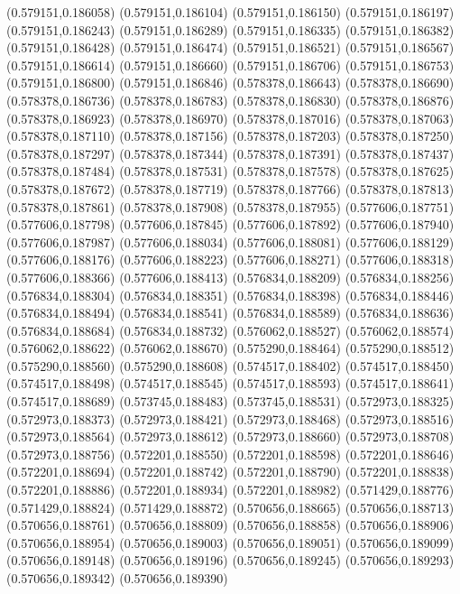 (0.579151,0.186058)
(0.579151,0.186104)
(0.579151,0.186150)
(0.579151,0.186197)
(0.579151,0.186243)
(0.579151,0.186289)
(0.579151,0.186335)
(0.579151,0.186382)
(0.579151,0.186428)
(0.579151,0.186474)
(0.579151,0.186521)
(0.579151,0.186567)
(0.579151,0.186614)
(0.579151,0.186660)
(0.579151,0.186706)
(0.579151,0.186753)
(0.579151,0.186800)
(0.579151,0.186846)
(0.578378,0.186643)
(0.578378,0.186690)
(0.578378,0.186736)
(0.578378,0.186783)
(0.578378,0.186830)
(0.578378,0.186876)
(0.578378,0.186923)
(0.578378,0.186970)
(0.578378,0.187016)
(0.578378,0.187063)
(0.578378,0.187110)
(0.578378,0.187156)
(0.578378,0.187203)
(0.578378,0.187250)
(0.578378,0.187297)
(0.578378,0.187344)
(0.578378,0.187391)
(0.578378,0.187437)
(0.578378,0.187484)
(0.578378,0.187531)
(0.578378,0.187578)
(0.578378,0.187625)
(0.578378,0.187672)
(0.578378,0.187719)
(0.578378,0.187766)
(0.578378,0.187813)
(0.578378,0.187861)
(0.578378,0.187908)
(0.578378,0.187955)
(0.577606,0.187751)
(0.577606,0.187798)
(0.577606,0.187845)
(0.577606,0.187892)
(0.577606,0.187940)
(0.577606,0.187987)
(0.577606,0.188034)
(0.577606,0.188081)
(0.577606,0.188129)
(0.577606,0.188176)
(0.577606,0.188223)
(0.577606,0.188271)
(0.577606,0.188318)
(0.577606,0.188366)
(0.577606,0.188413)
(0.576834,0.188209)
(0.576834,0.188256)
(0.576834,0.188304)
(0.576834,0.188351)
(0.576834,0.188398)
(0.576834,0.188446)
(0.576834,0.188494)
(0.576834,0.188541)
(0.576834,0.188589)
(0.576834,0.188636)
(0.576834,0.188684)
(0.576834,0.188732)
(0.576062,0.188527)
(0.576062,0.188574)
(0.576062,0.188622)
(0.576062,0.188670)
(0.575290,0.188464)
(0.575290,0.188512)
(0.575290,0.188560)
(0.575290,0.188608)
(0.574517,0.188402)
(0.574517,0.188450)
(0.574517,0.188498)
(0.574517,0.188545)
(0.574517,0.188593)
(0.574517,0.188641)
(0.574517,0.188689)
(0.573745,0.188483)
(0.573745,0.188531)
(0.572973,0.188325)
(0.572973,0.188373)
(0.572973,0.188421)
(0.572973,0.188468)
(0.572973,0.188516)
(0.572973,0.188564)
(0.572973,0.188612)
(0.572973,0.188660)
(0.572973,0.188708)
(0.572973,0.188756)
(0.572201,0.188550)
(0.572201,0.188598)
(0.572201,0.188646)
(0.572201,0.188694)
(0.572201,0.188742)
(0.572201,0.188790)
(0.572201,0.188838)
(0.572201,0.188886)
(0.572201,0.188934)
(0.572201,0.188982)
(0.571429,0.188776)
(0.571429,0.188824)
(0.571429,0.188872)
(0.570656,0.188665)
(0.570656,0.188713)
(0.570656,0.188761)
(0.570656,0.188809)
(0.570656,0.188858)
(0.570656,0.188906)
(0.570656,0.188954)
(0.570656,0.189003)
(0.570656,0.189051)
(0.570656,0.189099)
(0.570656,0.189148)
(0.570656,0.189196)
(0.570656,0.189245)
(0.570656,0.189293)
(0.570656,0.189342)
(0.570656,0.189390)
